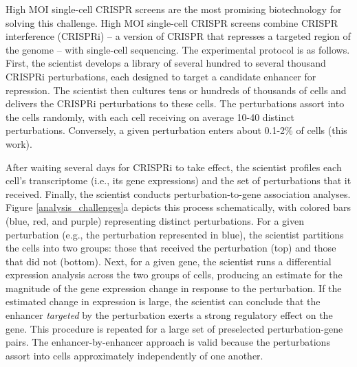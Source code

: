 \documentclass[12pt]{article}
\begin{document}
High MOI single-cell CRISPR screens are the most promising biotechnology for solving this challenge. High MOI single-cell CRISPR screens combine CRISPR interference (CRISPRi) -- a version of CRISPR that represses a targeted region of the genome -- with single-cell sequencing. The experimental protocol is as follows. First, the scientist develops a library of several hundred to several thousand CRISPRi perturbations, each designed to target a candidate enhancer for repression. The scientist then cultures tens or hundreds of thousands of cells and delivers the CRISPRi perturbations to these cells. The perturbations assort into the cells randomly, with each cell receiving on average 10-40 distinct perturbations. Conversely, a given perturbation enters about 0.1-2\% of cells (this work).

After waiting several days for CRISPRi to take effect, the scientist profiles each cell's transcriptome (i.e., its gene expressions) and the set of perturbations that it received. Finally, the scientist conducts perturbation-to-gene association analyses. Figure \ref{analysis_challenges}a depicts this process schematically, with colored bars (blue, red, and purple) representing distinct perturbations. For a given perturbation (e.g., the perturbation represented in blue), the scientist partitions the cells into two groups: those that received the perturbation (top) and those that did not (bottom). Next, for a given gene, the scientist runs a differential expression analysis across the two groups of cells, producing an estimate for the magnitude of the gene expression change in response to the perturbation. If the estimated change in expression is large, the scientist can conclude that the enhancer \textit{targeted} by the perturbation exerts a strong regulatory effect on the gene. This procedure is repeated for a large set of preselected perturbation-gene pairs. The enhancer-by-enhancer approach is valid because the perturbations assort into cells approximately independently of one another.
\end{document}
